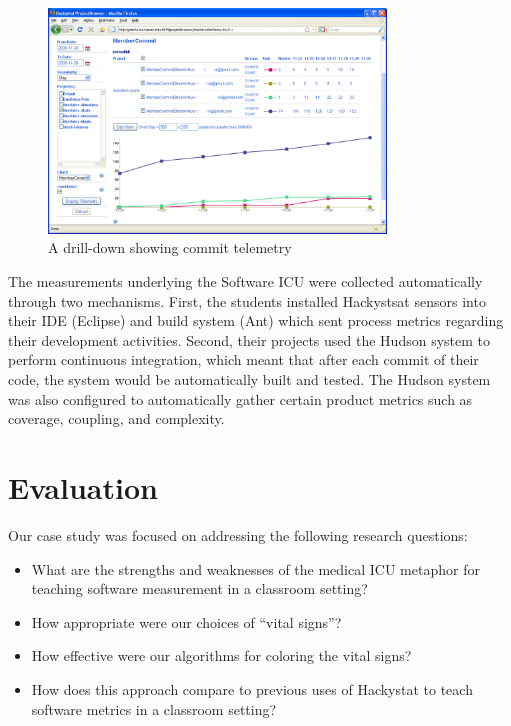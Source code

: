 \documentclass{acm_proc_article-sp}
\begin{document}
\begin{figure}[ht]
  \center
  \includegraphics[width=0.8\textwidth]{telemetry-screen.eps}
  \caption{A drill-down showing commit telemetry}
  \label{fig:telemetry}
\end{figure} 

The measurements underlying the Software ICU were collected automatically
through two mechanisms. First, the students installed Hackystsat sensors
into their IDE (Eclipse) and build system (Ant) which sent process
metrics regarding their development activities.  Second, their projects
used the Hudson system to perform continuous integration, which meant that
after each commit of their code, the system would be automatically built
and tested.  The Hudson system was also configured to automatically gather
certain product metrics such as coverage, coupling, and complexity.

\section{Evaluation}
\label{sec:evaluation}

Our case study was focused on addressing the following research questions: 
\begin{itemize}
\item What are the strengths and weaknesses of the medical ICU metaphor for 
teaching software measurement in a classroom setting? 
\item How appropriate were our choices of ``vital signs''?
\item How effective were our algorithms for coloring the vital signs? 
\item How does this approach compare to previous uses of Hackystat to teach software metrics
in a classroom setting? 
\end{itemize}
\end{document}
